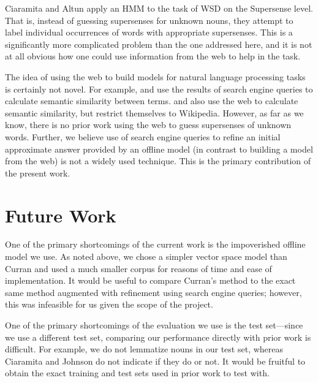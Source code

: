 \documentclass{article}
\begin{document}
Ciaramita and Altun \cite{ciaramita-altun} apply an HMM to the task of WSD on the Supersense level.
That is, instead of guessing supersenses for unknown nouns, they attempt to label individual occurrences of words with appropriate supersenses.
This is a significantly more complicated problem than the one addressed here, and it is not at all obvious how one could use information from the web to help in the task.


The idea of using the web to build models for natural language processing tasks is certainly not novel.
For example, \cite{bollegala} and \cite{gracia} use the results of search engine queries to calculate semantic similarity between terms.
\cite{strube} and \cite{gabrilovich} also use the web to calculate semantic similarity, but restrict themselves to Wikipedia.
However, as far as we know, there is no prior work using the web to guess supersenses of unknown words.
Further, we believe use of search engine queries to refine an initial approximate answer provided by an offline model (in contrast to building a model from the web) is not a widely used technique.
This is the primary contribution of the present work.

\section{Future Work}


One of the primary shortcomings of the current work is the impoverished offline model we use.
As noted above, we chose a simpler vector space model than Curran \cite{curran} and used a much smaller corpus for reasons of time and ease of implementation.
It would be useful to compare Curran's method to the exact same method augmented with refinement using search engine queries; however, this was infeasible for us given the scope of the project.

One of the primary shortcomings of the evaluation we use is the test set---since we use a different test set, comparing our performance directly with prior work is difficult.
For example, we do not lemmatize nouns in our test set, whereas Ciaramita and Johnson \cite{cj} do not indicate if they do or not.
It would be fruitful to obtain the exact training and test sets used in prior work to test with.
\end{document}

